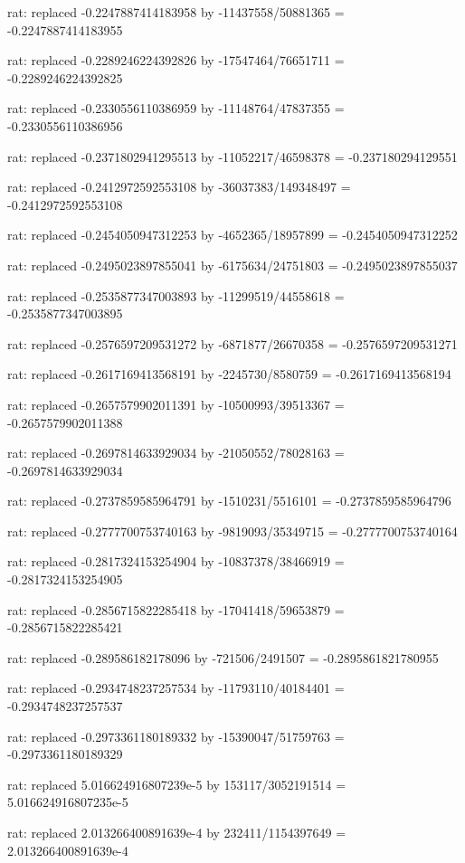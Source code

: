 \documentclass[a4paper,10pt]{article}
\begin{document}
\begin{eulernotebook}
\begin{eulercomment}
\begin{eulercomment}
\begin{eulercomment}
\begin{eulercomment}
\begin{eulercomment}
\begin{eulercomment}
\begin{eulercomment}
\begin{eulercomment}
\begin{eulercomment}
\begin{eulercomment}
\begin{eulercomment}
\begin{eulercomment}
\begin{eulercomment}
\begin{eulercomment}
\begin{eulercomment}
\begin{eulercomment}
\begin{euleroutput}
  rat: replaced -0.2247887414183958 by -11437558/50881365 = -0.2247887414183955
  
  rat: replaced -0.2289246224392826 by -17547464/76651711 = -0.2289246224392825
  
  rat: replaced -0.2330556110386959 by -11148764/47837355 = -0.2330556110386956
  
  rat: replaced -0.2371802941295513 by -11052217/46598378 = -0.237180294129551
  
  rat: replaced -0.2412972592553108 by -36037383/149348497 = -0.2412972592553108
  
  rat: replaced -0.2454050947312253 by -4652365/18957899 = -0.2454050947312252
  
  rat: replaced -0.2495023897855041 by -6175634/24751803 = -0.2495023897855037
  
  rat: replaced -0.2535877347003893 by -11299519/44558618 = -0.2535877347003895
  
  rat: replaced -0.2576597209531272 by -6871877/26670358 = -0.2576597209531271
  
  rat: replaced -0.2617169413568191 by -2245730/8580759 = -0.2617169413568194
  
  rat: replaced -0.2657579902011391 by -10500993/39513367 = -0.2657579902011388
  
  rat: replaced -0.2697814633929034 by -21050552/78028163 = -0.2697814633929034
  
  rat: replaced -0.2737859585964791 by -1510231/5516101 = -0.2737859585964796
  
  rat: replaced -0.2777700753740163 by -9819093/35349715 = -0.2777700753740164
  
  rat: replaced -0.2817324153254904 by -10837378/38466919 = -0.2817324153254905
  
  rat: replaced -0.2856715822285418 by -17041418/59653879 = -0.2856715822285421
  
  rat: replaced -0.289586182178096 by -721506/2491507 = -0.2895861821780955
  
  rat: replaced -0.2934748237257534 by -11793110/40184401 = -0.2934748237257537
  
  rat: replaced -0.2973361180189332 by -15390047/51759763 = -0.2973361180189329
  
  rat: replaced 5.016624916807239e-5 by 153117/3052191514 = 5.016624916807235e-5
  
  rat: replaced 2.013266400891639e-4 by 232411/1154397649 = 2.013266400891639e-4
  

\end{euleroutput}
\end{eulercomment}
\end{eulercomment}
\end{eulercomment}
\end{eulercomment}
\end{eulercomment}
\end{eulercomment}
\end{eulercomment}
\end{eulercomment}
\end{eulercomment}
\end{eulercomment}
\end{eulercomment}
\end{eulercomment}
\end{eulercomment}
\end{eulercomment}
\end{eulercomment}
\end{eulercomment}
\end{eulernotebook}
\end{document}
